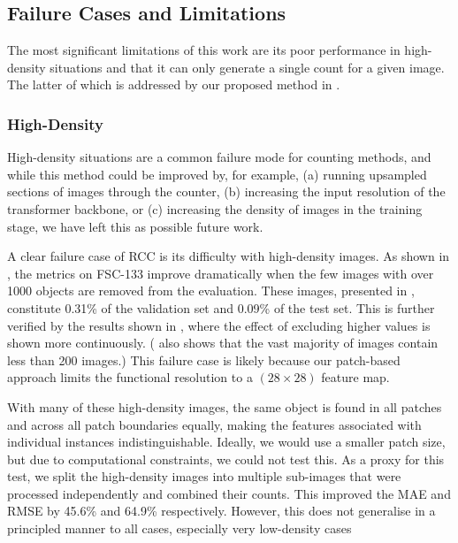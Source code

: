 \documentclass[../thesis.tex]{subfiles}
\begin{document}
\begin{table}
    \centering
    
    \caption{Performance results for varying sizes and frequencies of our tiling augmentation on FSC-147. Images are tiled in either a (2$\times$2) grid or in one of a (4$\times$4) or (2$\times$2) grid with equal probability.
    }
    \label{table__LTCA__ablation_tile2}
\end{table}


\subsection{Failure Cases and Limitations}
\label{LTCA__sec__failure_cases}

The most significant limitations of this work are its poor performance in high-density situations and that it can only generate a single count for a given image. The latter of which is addressed by our proposed method in .

\subsubsection{High-Density}
High-density situations are a common failure mode for counting methods, and while this method could be improved by, for example, (a) running upsampled sections of images through the counter, (b) increasing the input resolution of the transformer backbone, or (c) increasing the density of images in the training stage, we have left this as possible future work.

A clear failure case of RCC is its difficulty with high-density images.
As shown in , the metrics on FSC-133 improve dramatically when the few images with over 1000 objects are removed from the evaluation.
These images, presented in , constitute 0.31\% of the validation set and 0.09\% of the test set.
This is further verified by the results shown in , where the effect of excluding higher values is shown more continuously.
( also shows that the vast majority of images contain less than 200 images.)
This failure case is likely because our patch-based approach limits the functional resolution to a $(28\times28)$ feature map.

With many of these high-density images, the same object is found in all patches and across all patch boundaries equally, making the features associated with individual instances indistinguishable. 
Ideally, we would use a smaller patch size, but due to computational constraints, we could not test this.
As a proxy for this test, we split the high-density images into multiple sub-images that were processed independently and combined their counts.
This improved the  MAE and RMSE by 45.6\% and 64.9\% respectively. 
However, this does not generalise in a principled manner to all cases, especially very low-density cases
\end{document}
